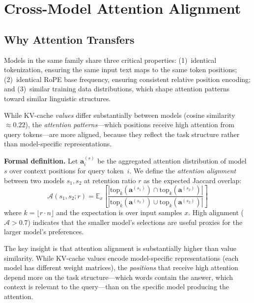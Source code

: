 \documentclass[journal]{IEEEtran}
\begin{document}
\section{Cross-Model Attention Alignment}
\label{sec:attention}

\subsection{Why Attention Transfers}

Models in the same family share three critical properties: (1)~identical tokenization, ensuring the same input text maps to the same token positions; (2)~identical RoPE base frequency, ensuring consistent relative position encoding; and (3)~similar training data distributions, which shape attention patterns toward similar linguistic structures.

While KV-cache \emph{values} differ substantially between models (cosine similarity $\approx 0.22$), the \emph{attention patterns}---which positions receive high attention from query tokens---are more aligned, because they reflect the task structure rather than model-specific representations.

\textbf{Formal definition.}
Let $\mathbf{a}_i^{(s)}$ be the aggregated attention distribution of model~$s$ over context positions for query token~$i$.
We define the \emph{attention alignment} between two models $s_1, s_2$ at retention ratio $r$ as the expected Jaccard overlap:
\begin{equation}
    \mathcal{A}(s_1, s_2; r) = \mathbb{E}_{x}\left[\frac{|\text{top}_k(\mathbf{a}^{(s_1)}) \cap \text{top}_k(\mathbf{a}^{(s_2)})|}{|\text{top}_k(\mathbf{a}^{(s_1)}) \cup \text{top}_k(\mathbf{a}^{(s_2)})|}\right]
\end{equation}
where $k = \lfloor r \cdot n \rfloor$ and the expectation is over input samples $x$.
High alignment ($\mathcal{A} > 0.7$) indicates that the smaller model's selections are useful proxies for the larger model's preferences.

The key insight is that attention alignment is substantially higher than value similarity.
While KV-cache values encode model-specific representations (each model has different weight matrices), the \emph{positions} that receive high attention depend more on the task structure---which words contain the answer, which context is relevant to the query---than on the specific model producing the attention.
\end{document}
